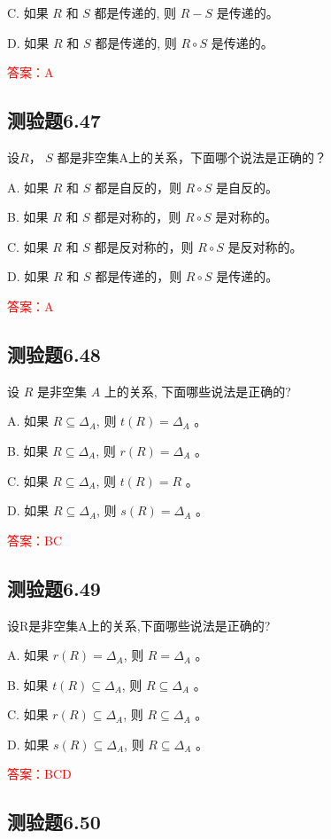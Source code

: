 \documentclass[UTF8, heading=true]{ctexart}
\begin{document}
C. 
如果 $R$ 和 $S$ 都是传递的, 则 $R-S$ 是传递的。

D. 
如果 $R$ 和 $S$ 都是传递的, 则 $R \circ S$ 是传递的。

\textcolor{red}{答案：A}

\subsection{测验题6.47}

设$R$， $S$ 都是非空集A上的关系，下面哪个说法是正确的？

A. 如果 $R$ 和 $S$ 都是自反的，则 $R \circ S$ 是自反的。

B. 
如果 $R$ 和 $S$ 都是对称的，则 $R \circ S$ 是对称的。

C. 
如果 $R$ 和 $S$ 都是反对称的，则 $R \circ S$ 是反对称的。

D. 
如果 $R$ 和 $S$ 都是传递的，则 $R \circ S$ 是传递的。

\textcolor{red}{答案：A}

\subsection{测验题6.48}

设 $R$ 是非空集 $A$ 上的关系, 下面哪些说法是正确的?

A. 如果 $R \subseteq \Delta_A$, 则 $t(R)=\Delta_A$ 。

B. 
如果 $R \subseteq \Delta_A$, 则 $r(R)=\Delta_A$ 。

C. 
如果 $R \subseteq \Delta_A$, 则 $t(R)=R$ 。

D. 
如果 $R \subseteq \Delta_A$, 则 $s(R)=\Delta_A$ 。

\textcolor{red}{答案：BC}

\subsection{测验题6.49}
设R是非空集A上的关系,下面哪些说法是正确的?

A. 如果 $r(R)=\Delta_A$, 则 $R=\Delta_A$ 。

B. 如果 $t(R) \subseteq \Delta_A$, 则 $R \subseteq \Delta_A$ 。

C. 如果 $r(R) \subseteq \Delta_A$, 则 $R \subseteq \Delta_A$ 。

D. 如果 $s(R) \subseteq \Delta_A$, 则 $R \subseteq \Delta_A$ 。

\textcolor{red}{答案：BCD}

\subsection{测验题6.50}
\end{document}
